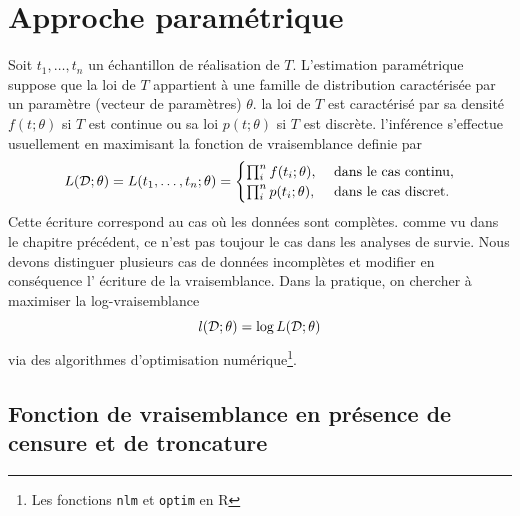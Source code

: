 \chapter{Approche paramétrique}\label{chap:parametric}
Soit $t_1,\ldots, t_n$ un échantillon de réalisation \iid de $T$. L'estimation paramétrique suppose que la loi de $T$ appartient à une famille de distribution caractérisée par un paramètre (vecteur de paramètres) $\theta$. la loi de $T$ est caractérisé par sa densité $f(t;\theta)$ si $T$ est continue ou sa loi $p(t;\theta)$ si $T$ est discrète. l'inférence s'effectue usuellement en maximisant la fonction de vraisemblance definie par 
$$
L(\mathcal{D};\theta) = L(t_1,\ldots, t_n;\theta) = \begin{cases}
\prod_{i}^nf(t_i;\theta),&\text{ dans le cas continu},\\
\prod_{i}^np(t_i;\theta),&\text{ dans le cas discret}.
\end{cases}
$$
Cette écriture correspond au cas où les données sont complètes. comme vu dans le chapitre précédent, ce n'est pas toujour le cas dans les analyses de survie. Nous devons distinguer plusieurs cas de données incomplètes et modifier en conséquence l' écriture de la vraisemblance. Dans la pratique, on chercher à maximiser la log-vraisemblance 
$$
l(\mathcal{D};\theta)=\log L(\mathcal{D};\theta)
$$
via des algorithmes d'optimisation numérique\footnote{Les fonctions \texttt{nlm} et \texttt{optim} en R}.

\section{Fonction de vraisemblance en présence de censure et de troncature}\label{sec:like}

